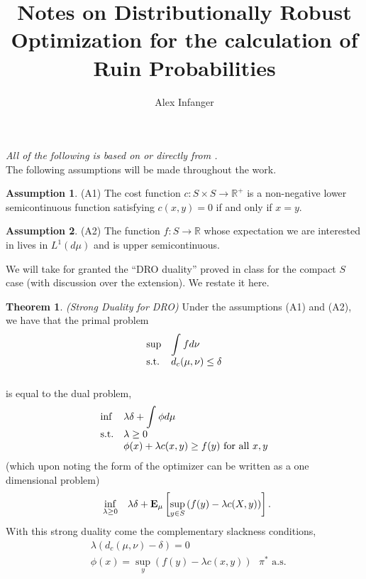 \documentclass[12pt]{article}
\newcommand{\R}{\mathbb{R}}
\newcommand{\E}{\textbf{E}}
\theoremstyle{definition}
\newtheorem{theorem}{Theorem}
\theoremstyle{definition}
\newtheorem{assumption}{Assumption}
\theoremstyle{definition}
\begin{document}
\title{Notes on Distributionally Robust Optimization for the calculation of Ruin Probabilities}
\author{Alex Infanger}
\maketitle
\emph{All of the following is based on or directly from \cite{JosePaper}.}\\

The following assumptions will be made throughout the work.
\begin{assumption} (A1) The cost function $c:S\times S\rightarrow\R^+$ is a non-negative lower semicontinuous function satisfying $c(x,y)=0$ if and only if $x=y$.
\end{assumption}
\begin{assumption} (A2) The function $f:S\rightarrow\R$ whose expectation we are interested in lives in $L^1(d\mu)$ and is upper semicontinuous.
\end{assumption}

We will take for granted the ``DRO duality'' proved in class for the compact $S$ case (with discussion over the extension). We restate it here.

\begin{theorem} \emph{(Strong Duality for DRO)} \label{strong_duality} Under the assumptions (A1) and (A2), we have that the primal problem
\begin{align*}
\begin{array}{ll@{}ll}
\displaystyle \sup   &\displaystyle \int_{}^{}f d\nu &\\
\text{s.t.}&  d_c(\mu,\nu)\leq \delta\\
                 & 
\end{array}
\end{align*}
is equal to the dual problem, 
\begin{align*}
\begin{array}{ll@{}ll}
\displaystyle \inf  &\displaystyle \lambda \delta + \int_{}^{}\phi d\mu &\\
\text{s.t.}& \lambda\geq 0 \\
          & \phi(x)+\lambda c(x,y) \geq f(y) \text{ for all $x,y$}
\end{array}
\end{align*}
(which upon noting the form of the optimizer can be written as a one dimensional problem)
\begin{align*}
\begin{array}{ll@{}ll}
\displaystyle \inf_{\lambda\geq 0}  &\displaystyle \lambda\delta +  \E_{\mu}\left[\sup_{y\in S} \left(f(y)-\lambda c(X,y)\right)\right]. 
\end{array}
\end{align*}
With this strong duality come the complementary slackness conditions,
\begin{align*}
&\lambda\left(d_c(\mu,\nu)-\delta\right)=0\\
&\phi(x)=\sup_y \left(f(y)-\lambda c(x,y)\right) \text{ $\pi^*$ a.s.}
\end{align*}
\end{theorem}
\end{document}
